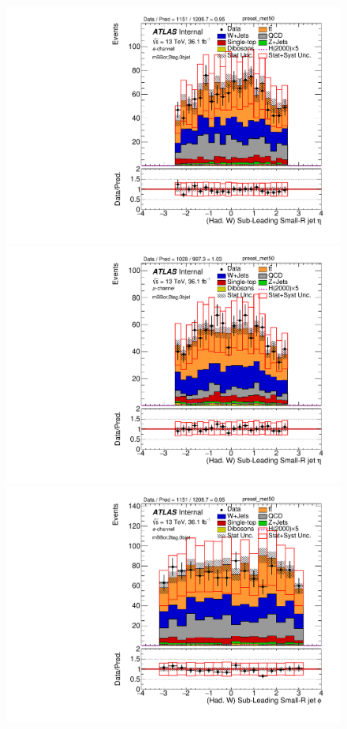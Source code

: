 \begin{figure}[!ht]
\begin{center}
\includegraphics[scale=0.33]{./figures/boosted/PlotByChannels/DataMC_2tag_0bjet_mbbcr_elec_presel_met50_LightJet2Eta}                                                                               
\includegraphics[scale=0.33]{./figures/boosted/PlotByChannels/DataMC_2tag_0bjet_mbbcr_muon_presel_met50_LightJet2Eta}                                                                               
\includegraphics[scale=0.33]{./figures/boosted/PlotByChannels/DataMC_2tag_0bjet_mbbcr_elec_presel_met50_LightJet2Phi}                                                                               

\end{center}
\end{figure}
